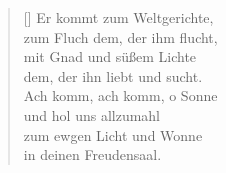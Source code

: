 \begin{multicols}{2}
\begin{verse}[\versewidth]
   Er kommt zum Weltgerichte,\\
  zum Fluch dem, der ihm flucht,\\
  mit Gnad und süßem Lichte\\
  dem, der ihn liebt und sucht.\\
  Ach komm, ach komm, o Sonne\\%
  und hol uns allzumahl\\
  zum ewgen Licht und Wonne\\
  in deinen Freudensaal.

\end{verse}
\end{multicols}
